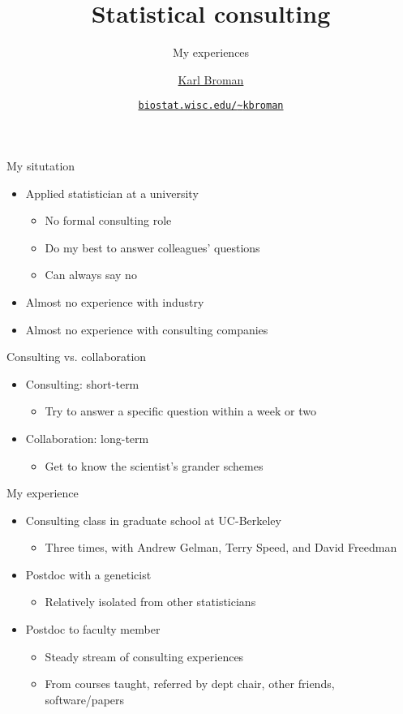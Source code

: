 \documentclass[12pt,t]{beamer}
\title{Statistical consulting}
\subtitle{My experiences}
\author{\href{http://www.biostat.wisc.edu/~kbroman}{Karl Broman}}
\institute{\href{http://www.biostat.wisc.edu}{Biostatistics \& Medical Informatics} \\[2pt] \href{http://www.wisc.edu}{University of Wisconsin{\textendash}Madison}}
\date{\href{http://www.biostat.wisc.edu/~kbroman}{\tt \scriptsize biostat.wisc.edu/{\textasciitilde}kbroman}}
\newcommand{\bbi}{\vspace{24pt} \begin{itemize} \itemsep12pt}
\newcommand{\bi}{\begin{itemize}}
\newcommand{\ei}{\end{itemize}}
\begin{document}
{
\frame{
  \titlepage
} }



\begin{frame}{My situtation}

\bbi
\item Applied statistician at a university
\bi
\item No formal consulting role
\item Do my best to answer colleagues' questions
\item Can always say no
\ei
\item Almost no experience with industry
\item Almost no experience with consulting companies
\ei

\end{frame}

\begin{frame}{Consulting vs. collaboration}

\bbi
\item {\color{hilight} Consulting}: short-term
\bi
\item Try to answer a specific question within a week or two
\ei
\item {\color{hilight} Collaboration}: long-term
\bi
\item Get to know the scientist's grander schemes
\ei

\ei

\end{frame}

\begin{frame}{My experience}

\bbi
\item Consulting class in graduate school at UC-Berkeley
\bi
\item Three times, with Andrew Gelman, Terry Speed, and David Freedman
\ei
\item Postdoc with a geneticist
\bi
\item Relatively isolated from other statisticians
\ei
\item Postdoc to faculty member
\bi
\item Steady stream of consulting experiences
\item From courses taught, referred by dept chair, other friends, software/papers
\ei
\ei

\end{frame}
\end{document}
